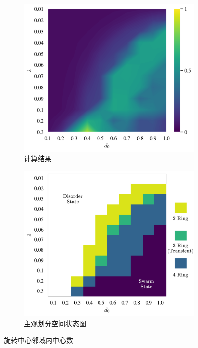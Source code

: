 \documentclass{article}
\begin{document}
\vspace{-0.5cm}
\begin{figure}[H]
	\centering
	\begin{subfigure}[b]{0.49\textwidth}
		\includegraphics[width=\textwidth]{./figs/nearbyNumsRing.png}
		\vspace{-1cm}
		\caption{计算结果}
		
	\end{subfigure}
	\begin{subfigure}[b]{0.49\textwidth}
		\includegraphics[width=\textwidth]{./figs/subjectiveOpRing.png}
		\vspace{-1cm}
		\caption{主观划分空间状态图}
	\end{subfigure}
	\vspace{-0.5cm}
	\caption{旋转中心邻域内中心数}
	\label{fig:fig234c.7.1}
\end{figure}


\end{document}
